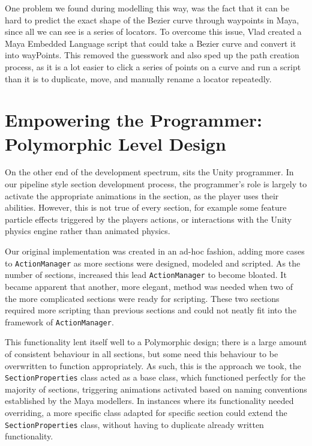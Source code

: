 \documentclass[a4paper,oneside]{memoir}
\begin{document}
			One problem we found during modelling this way, was the fact that it can be hard to predict the exact shape of the Bezier curve through waypoints in Maya, since all we can see is a series of locators.
			To overcome this issue, Vlad created a Maya Embedded Language script that could take a Bezier curve and convert it into wayPoints.
			This removed the guesswork and also sped up the path creation process, as it is a lot easier to click a series of points on a curve and run a script than it is to duplicate, move, and manually rename a locator repeatedly.

		\section{Empowering the Programmer: Polymorphic Level Design}

			On the other end of the development spectrum, sits the Unity programmer.
			In our pipeline style section development process, the programmer's role is largely to activate the appropriate animations in the section, as the player uses their abilities.
			However, this is not true of every section, for example some feature particle effects triggered by the players actions, or interactions with the Unity physics engine rather than animated physics. 

			Our original implementation was created in an ad-hoc fashion, adding more cases to \texttt{ActionManager} as more sections were designed, modeled and scripted. 
			As the number of sections, increased this lead \texttt{ActionManager} to become bloated. 
			It became apparent that another, more elegant, method was needed when two of the more complicated sections were ready for scripting. 
			These two sections required more scripting than previous sections and could not neatly fit into the framework of \texttt{ActionManager}. 

			This functionality lent itself well to a Polymorphic design; there is a large amount of consistent behaviour in all sections, but some need this behaviour to be overwritten to function appropriately.
			As such, this is the approach we took, the \texttt{SectionProperties} class acted as a base class, which functioned perfectly for the majority of sections, triggering animations activated based on naming conventions established by the Maya modellers.
			In instances where its functionality needed overriding, a more specific class adapted for specific section could extend the \texttt{SectionProperties} class, without having to duplicate already written functionality.
\end{document}
